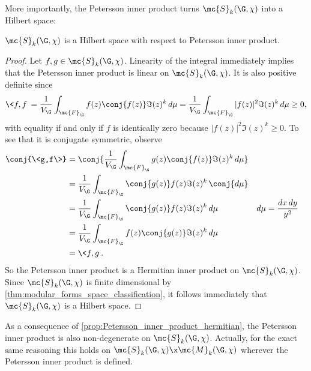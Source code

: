     More importantly, the Petersson inner product turns $\mc{S}_{k}(\G,\chi)$ into a Hilbert space:

    \begin{proposition}\label{prop:Petersson_inner_product_hermitian}
      $\mc{S}_{k}(\G,\chi)$ is a Hilbert space with respect to Petersson inner product.
    \end{proposition}
    \begin{proof}
      Let $f,g \in \mc{S}_{k}(\G,\chi)$. Linearity of the integral immediately implies that the Petersson inner product is linear on $\mc{S}_{k}(\G,\chi)$. It is also positive definite since
      \[
        \<f,f\> = \frac{1}{V_{\G}}\int_{\mc{F}_{\G}}f(z)\conj{f(z)}\Im(z)^{k}\,d\mu = \frac{1}{V_{\G}}\int_{\mc{F}_{\G}}|f(z)|^{2}\Im(z)^{k}\,d\mu \ge 0,
      \]
      with equality if and only if $f$ is identically zero because $|f(z)|^{2}\Im(z)^{k} \ge 0$. To see that it is conjugate symmetric, observe
      \begin{align*}
        \conj{\<g,f\>} &= \conj{\frac{1}{V_{\G}}\int_{\mc{F}_{\G}}g(z)\conj{f(z)}\Im(z)^{k}\,d\mu} \\
        &= \frac{1}{V_{\G}}\int_{\mc{F}_{\G}}\conj{g(z)}f(z)\Im(z)^{k}\,\conj{d\mu} \\
        &= \frac{1}{V_{\G}}\int_{\mc{F}_{\G}}\conj{g(z)}f(z)\Im(z)^{k}\,d\mu && \text{$d\mu = \frac{dx\,dy}{y^{2}}$} \\
        &= \frac{1}{V_{\G}}\int_{\mc{F}_{\G}}f(z)\conj{g(z)}\Im(z)^{k}\,d\mu \\
        &= \<f,g\>.
      \end{align*}
      So the Petersson inner product is a Hermitian inner product on $\mc{S}_{k}(\G,\chi)$. Since $\mc{S}_{k}(\G,\chi)$ is finite dimensional by \cref{thm:modular_forms_space_classification}, it follows immediately that $\mc{S}_{k}(\G,\chi)$ is a Hilbert space.
    \end{proof}

    \begin{remark}\label{rem:non-degeneracy_of_Petersson_inner_product}
      As a consequence of \cref{prop:Petersson_inner_product_hermitian}, the Petersson inner product is also non-degenerate on $\mc{S}_{k}(\G,\chi)$. Actually, for the exact same reasoning this holds on $\mc{S}_{k}(\G,\chi) \x \mc{M}_{k}(\G,\chi)$ wherever the Petersson inner product is defined.
    \end{remark}

